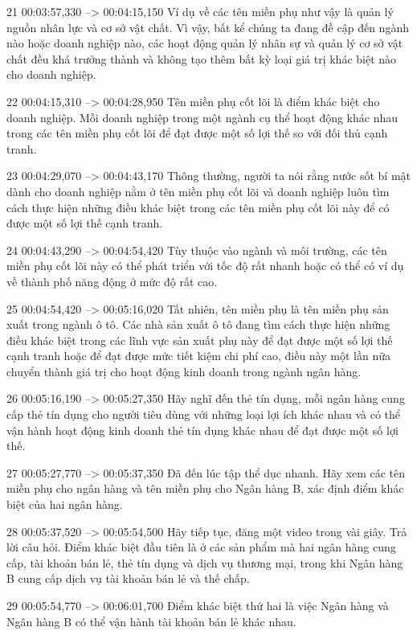 21
00:03:57,330 --> 00:04:15,150
Ví dụ về các tên miền phụ như vậy là quản lý nguồn nhân lực và cơ sở vật chất.  Vì vậy, bất kể chúng ta đang đề cập đến ngành nào hoặc doanh nghiệp nào, các hoạt động quản lý nhân sự và quản lý cơ sở vật chất đều khá trưởng thành và không tạo thêm bất kỳ loại giá trị khác biệt nào cho doanh nghiệp.

22
00:04:15,310 --> 00:04:28,950
Tên miền phụ cốt lõi là điểm khác biệt cho doanh nghiệp.  Mỗi doanh nghiệp trong một ngành cụ thể hoạt động khác nhau trong các tên miền phụ cốt lõi để đạt được một số lợi thế so với đối thủ cạnh tranh.

23
00:04:29,070 --> 00:04:43,170
Thông thường, người ta nói rằng nước sốt bí mật dành cho doanh nghiệp nằm ở tên miền phụ cốt lõi và doanh nghiệp luôn tìm cách thực hiện những điều khác biệt trong các tên miền phụ cốt lõi này để có được một số lợi thế cạnh tranh.

24
00:04:43,290 --> 00:04:54,420
Tùy thuộc vào ngành và môi trường, các tên miền phụ cốt lõi này có thể phát triển với tốc độ rất nhanh hoặc có thể có ví dụ về thành phố năng động ở mức độ rất cao.

25
00:04:54,420 --> 00:05:16,020
Tất nhiên, tên miền phụ là tên miền phụ sản xuất trong ngành ô tô.  Các nhà sản xuất ô tô đang tìm cách thực hiện những điều khác biệt trong các lĩnh vực sản xuất phụ này để đạt được một số lợi thế cạnh tranh hoặc để đạt được mức tiết kiệm chi phí cao, điều này một lần nữa chuyển thành giá trị cho hoạt động kinh doanh trong ngành ngân hàng.

26
00:05:16,190 --> 00:05:27,350
Hãy nghĩ đến thẻ tín dụng, mỗi ngân hàng cung cấp thẻ tín dụng cho người tiêu dùng với những loại lợi ích khác nhau và có thể vận hành hoạt động kinh doanh thẻ tín dụng khác nhau để đạt được một số lợi thế.

27
00:05:27,770 --> 00:05:37,350
Đã đến lúc tập thể dục nhanh.  Hãy xem các tên miền phụ cho ngân hàng và tên miền phụ cho Ngân hàng B, xác định điểm khác biệt của hai ngân hàng.

28
00:05:37,520 --> 00:05:54,500
Hãy tiếp tục, đăng một video trong vài giây.  Trả lời câu hỏi.  Điểm khác biệt đầu tiên là ở các sản phẩm mà hai ngân hàng cung cấp, tài khoản bán lẻ, thẻ tín dụng và dịch vụ thương mại, trong khi Ngân hàng B cung cấp dịch vụ tài khoản bán lẻ và thế chấp.

29
00:05:54,770 --> 00:06:01,700
Điểm khác biệt thứ hai là việc Ngân hàng và Ngân hàng B có thể vận hành tài khoản bán lẻ khác nhau.

